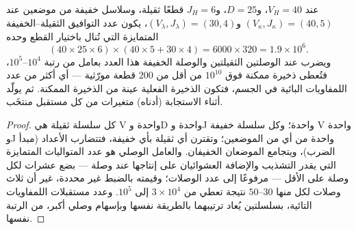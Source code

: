 \begin{theorem}\label{thm:b3:adaptive-immunity:repertoire}
عند $V_{H} = 40$، و$D = 25$، و$J_{H} = 6$ قطعًا ثقيلة، وسلاسل
خفيفة من موضعين عند $(V_{\kappa}, J_{\kappa}) = (40, 5)$
و$(V_{\lambda}, J_{\lambda}) = (30, 4)$، يكون عدد التوافيق
الثقيلة--الخفيفة المتمايزة التي تُنال باختيار القطع وحده
\[
(40\times 25\times 6)\times(40\times 5 + 30\times 4) = 6000\times 320
= 1.9\times 10^{6}.
\]
ويضرب  عند الوصلتين الثقيلتين والوصلة الخفيفة
هذا العدد بعامل من رتبة $10^{4}$--$10^{5}$، فتُعطى ذخيرة
ممكنة فوق $10^{10}$ من أقل من $200$ قطعة مورّثية --- أي أكثر
من عدد اللمفاويات البائية في الجسم، فتكون الذخيرة الفعلية
عينة من الذخيرة الممكنة. ثم يولّد 
أثناء الاستجابة (أدناه) متغيرات من كل مستقبل منتخَب.
\end{theorem}
\begin{proof}
كل سلسلة ثقيلة هي V واحدة وD واحدة وJ واحدة؛ وكل سلسلة
خفيفة V واحدة وJ واحدة من أي من الموضعين؛ وتقترن أي ثقيلة
بأي خفيفة، فتتضارب الأعداد (مبدأ الضرب)، ويتجامع الموضعان
الخفيفان. والعامل الوصلي هو عدد المتواليات المتمايزة التي
يقدر التشذيب والإضافة العشوائيان على إنتاجها عند وصلة ---
بضع عشرات لكل وصلة على الأقل --- مرفوعًا إلى عدد الوصلات؛
وقيمته بالضبط غير محددة، غير أن ثلاث وصلات لكل منها
$30$--$50$ نتيجة تعطي من $3\times 10^{4}$ إلى $10^{5}$. وعدد
مستقبلات اللمفاويات التائية، بسلسلتين يُعاد ترتيبهما
بالطريقة نفسها وبإسهام وصلي أكبر، من الرتبة نفسها.
\end{proof}

